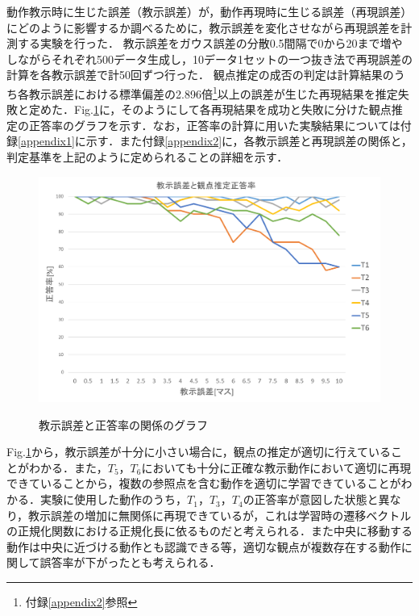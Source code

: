 動作教示時に生じた誤差（教示誤差）が，動作再現時に生じる誤差（再現誤差）にどのように影響するか調べるために，教示誤差を変化させながら再現誤差を計測する実験を行った．
教示誤差をガウス誤差の分散0.5間隔で0から20まで増やしながらそれぞれ500データ生成し，10データ1セットの一つ抜き法で再現誤差の計算を各教示誤差で計50回ずつ行った．
観点推定の成否の判定は計算結果のうち各教示誤差における標準偏差の2.896倍\footnote{付録\ref{appendix2}参照}以上の誤差が生じた再現結果を推定失敗と定めた．Fig.\ref{figure:success_rate}に，そのようにして各再現結果を成功と失敗に分けた観点推定の正答率のグラフを示す．なお，正答率の計算に用いた実験結果については付録\ref{appendix1}に示す．また付録\ref{appendix2}に，各教示誤差と再現誤差の関係と，判定基準を上記のように定められることの詳細を示す．
	\begin{figure}[h]
		\begin{center}
			\includegraphics[width=14cm]{chart2.png} \\ %
			\caption{教示誤差と正答率の関係のグラフ}
			\label{figure:success_rate}
		\end{center}
	\end{figure}

Fig.\ref{figure:success_rate}から，教示誤差が十分に小さい場合に，観点の推定が適切に行えていることがわかる．また，$T_{5}$，$T_{6}$においても十分に正確な教示動作において適切に再現できていることから，複数の参照点を含む動作を適切に学習できていることがわかる．実験に使用した動作のうち，$T_{1}$，$T_{3}$，$T_{4}$の正答率が意図した状態と異なり，教示誤差の増加に無関係に再現できているが，これは学習時の遷移ベクトルの正規化関数における正規化長に依るものだと考えられる．また中央に移動する動作は中央に近づける動作とも認識できる等，適切な観点が複数存在する動作に関して誤答率が下がったとも考えられる．

